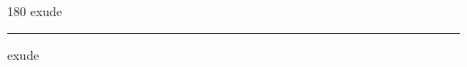 
\begin{frame}
\begin{center}
\begin{turn}{180}
{\fontsize{2.5cm}{1em}\selectfont exude}
\end{turn}
\vspace{1em}\par  
\hrule
\vspace{1em}\par  
{\fontsize{2.5cm}{1em}\selectfont exude}
\end{center}
\end{frame}
